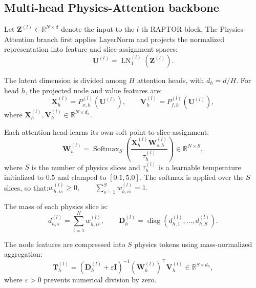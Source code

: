 \documentclass[a4paper,fleqn]{cas-sc}
\begin{document}
\subsection{Multi-head Physics-Attention backbone}
Let \(\mathbf{Z}^{(l)}\in\mathbb{R}^{N\times d}\) denote the input to the \(l\)-th RAPTOR block. The Physics-Attention branch first applies LayerNorm and projects the normalized representation into feature and slice-assignment spaces:
\begin{equation}
    \mathbf{U}^{(l)}
    =
    \operatorname{LN}_{1}^{(l)}
    \left(
        \mathbf{Z}^{(l)}
    \right).
    \label{eq:pa_normalization}
\end{equation}

The latent dimension is divided among \(H\) attention heads, with \(d_h=d/H\). For head \(h\), the projected node and value features are:
\begin{equation}
    \mathbf{X}_{h}^{(l)}
    =
    P_{x,h}^{(l)}
    \left(
        \mathbf{U}^{(l)}
    \right),
    \qquad
    \mathbf{V}_{h}^{(l)}
    =
    P_{f,h}^{(l)}
    \left(
        \mathbf{U}^{(l)}
    \right),
    \label{eq:head_features}
\end{equation}
where
\(\mathbf{X}_{h}^{(l)},\mathbf{V}_{h}^{(l)} \in\mathbb{R}^{N\times d_h}\).

Each attention head learns its own soft point-to-slice assignment:
\begin{equation}
    \mathbf{W}_{h}^{(l)}
    =
    \operatorname{Softmax}_{S}
    \left(
        \frac{
            \mathbf{X}_{h}^{(l)}
            \mathbf{W}_{s,h}^{(l)}
        }{
            \tau_{h}^{(l)}
        }
    \right)
    \in\mathbb{R}^{N\times S},
    \label{eq:slice_assignment}
\end{equation}
where \(S\) is the number of physics slices and \(\tau_h^{(l)}\) is a learnable temperature initialized to \(0.5\) and clamped to \([0.1,5.0]\). The softmax is applied over the \(S\) slices, so that:$ w_{h,is}^{(l)}\geq 0,  \qquad \sum_{s=1}^{S}w_{h,is}^{(l)}=1.$

The mass of each physics slice is:
\begin{equation}
    d_{h,s}^{(l)}
    =
    \sum_{i=1}^{N}
    w_{h,is}^{(l)},
    \qquad
    \mathbf{D}_{h}^{(l)}
    =
    \operatorname{diag}
    \left(
        d_{h,1}^{(l)},\ldots,d_{h,S}^{(l)}
    \right).
    \label{eq:slice_mass}
\end{equation}

The node features are compressed into \(S\) physics tokens using mass-normalized aggregation:
\begin{equation}
    \mathbf{T}_{h}^{(l)}
    =
    \left(
        \mathbf{D}_{h}^{(l)}
        +\varepsilon\mathbf{I}
    \right)^{-1}
    \left(
        \mathbf{W}_{h}^{(l)}
    \right)^{\top}
    \mathbf{V}_{h}^{(l)}
    \in\mathbb{R}^{S\times d_h},
    \label{eq:token_aggregation}
\end{equation}
where \(\varepsilon>0\) prevents numerical division by zero.
\end{document}
